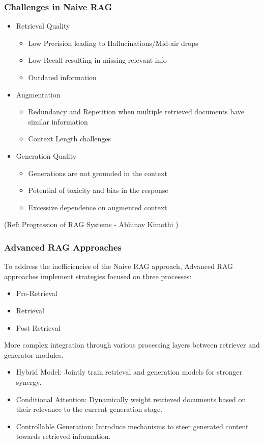 \begin{frame}[fragile]\frametitle{Challenges in Naive RAG}

\begin{itemize}
\item Retrieval Quality
	\begin{itemize}
	\item Low Precision leading to Hallucinations/Mid-air drops
	\item Low  Recall  resulting in  missing  relevant info
	\item Outdated information
	\end{itemize}
\item Augmentation
	\begin{itemize}
	\item Redundancy and Repetition when multiple retrieved documents have similar information
	\item Context Length challenges
	\end{itemize}
\item Generation Quality
	\begin{itemize}
	\item Generations are not grounded in the context 
	\item Potential of toxicity and bias in the response
	\item Excessive dependence on augmented context
	\end{itemize}
\end{itemize}	


{\tiny (Ref: Progression of RAG Systems - Abhinav Kimothi )}

\end{frame}

\begin{frame}[fragile]\frametitle{Advanced RAG Approaches}

To  address  the  inefficiencies  of  the  Naive  RAG  approach,  Advanced  RAG
approaches implement strategies focused on three processes:
\begin{itemize}
\item Pre-Retrieval
\item Retrieval
\item Post Retrieval
\end{itemize}	

More complex integration through various processing layers between retriever and generator modules.

\begin{itemize}
\item Hybrid Model: Jointly train retrieval and generation models for stronger synergy.
\item Conditional Attention: Dynamically weight retrieved documents based on their relevance to the current generation stage.
\item Controllable Generation: Introduce mechanisms to steer generated content towards retrieved information.
\end{itemize}	

\end{frame}

